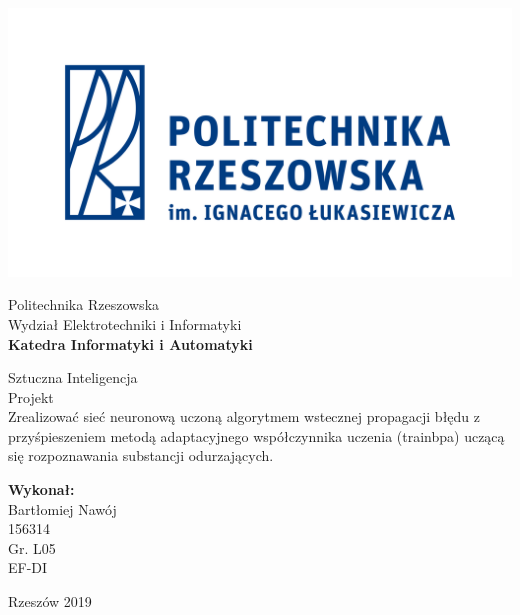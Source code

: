 \documentclass[a4paper, openright, twoside,11pt]{article}
\begin{document}
\begin{titlepage}
            \begin{minipage}{0.3\linewidth}
                    \includegraphics[width=1\columnwidth]{Grafika/prz_pl.png}
            \end{minipage}
            \begin{minipage}{0.7\linewidth}
                \begin{center}
                    \large{Politechnika Rzeszowska\\
                    Wydział Elektrotechniki i Informatyki\\}
                    \Large\textbf{Katedra Informatyki i Automatyki}\\
                \end{center}
            \end{minipage}

            \begin{center}

                \vfill
                    \Huge Sztuczna Inteligencja\\[2cm]
                    \huge Projekt\\[2cm]
                    \huge Zrealizować sieć neuronową uczoną algorytmem wstecznej propagacji błędu z przyśpieszeniem metodą adaptacyjnego współczynnika uczenia (trainbpa) uczącą się rozpoznawania substancji odurzających.\\
                \vfill
            \end{center}



            
            
            \mbox{}
            \vfill
            \begin{flushright}
               \large{\textbf{Wykonał: \\}
               Bartłomiej Nawój\\
               156314\\
               Gr. L05 \\
                 EF-DI\\[1cm]}
            \end{flushright}
            \begin{center}
                \large Rzeszów 2019
            \end{center}
        \end{titlepage}
        
\end{document}
